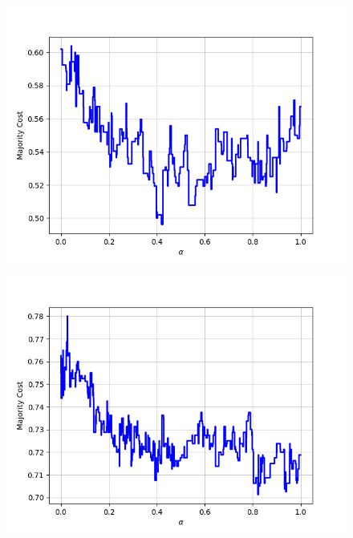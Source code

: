 \begin{figure}[h]
\begin{minipage}{.19\textwidth}
  {\includegraphics[width=\linewidth]{plots/omniglot-intra-ac-cnn/Korean}}
\end{minipage}
\begin{minipage}{.19\textwidth}
  \centering
  {\includegraphics[width=\linewidth]{plots/omniglot-intra-ac-cnn/Latin}}
\end{minipage}
\begin{minipage}{.19\textwidth}
  \centering

\end{minipage}
\end{figure}
